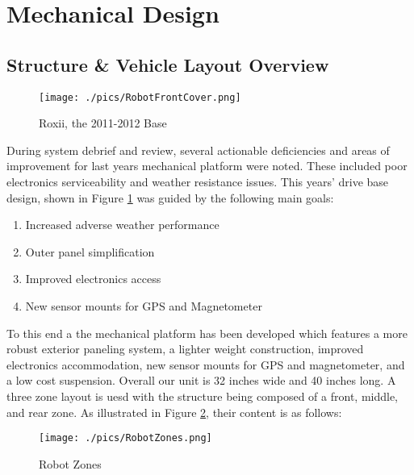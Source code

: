 \section{Mechanical Design}

\subsection{Structure \& Vehicle Layout Overview}

\begin{figure}[H]
\begin{center}
\texttt{[image: ./pics/RobotFrontCover.png]}
\caption{Roxii, the 2011-2012 Base}
\label{FIG:Roxii}
\end{center}
\end{figure}


  During system debrief and review, several actionable deficiencies and areas of improvement for last years mechanical platform were noted. These included poor electronics serviceability and weather resistance issues. This years' drive base design, shown in Figure \ref{FIG:Roxii} was guided by the following main goals:

\begin{enumerate}
\item Increased adverse weather performance
\item Outer panel simplification
\item Improved electronics access
\item New sensor mounts for GPS and Magnetometer
\end{enumerate}

To this end a the mechanical platform has been developed which features a more robust exterior paneling system, a lighter weight construction, improved electronics accommodation, new sensor mounts for GPS and magnetometer, and a low cost suspension. Overall our unit is 32 inches wide and 40 inches long. A three zone layout is uesd with the structure being composed of a front, middle, and rear zone. As illustrated in Figure \ref{FIG:Zones}, their content is as follows:

\begin{figure}[H]
\begin{center}
\texttt{[image: ./pics/RobotZones.png]}
\caption{Robot Zones}
\label{FIG:Zones}
\end{center}
\end{figure}

